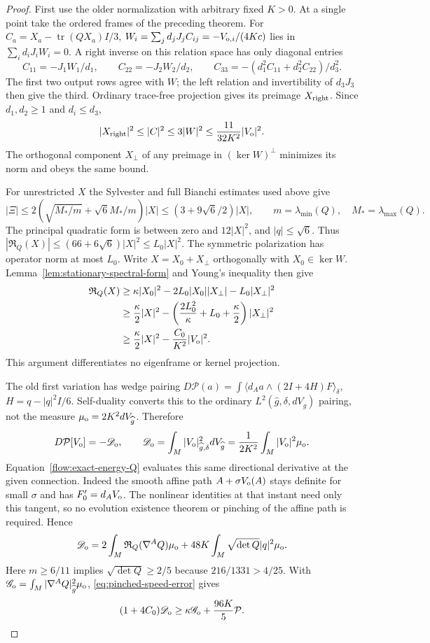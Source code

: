 \documentclass[11pt]{article}
\numberwithin{equation}{section}
\theoremstyle{definition}
\theoremstyle{remark}
\begin{document}
\begin{proof}
First use the older normalization with arbitrary fixed $K>0$.
At a single point take the ordered frames of the preceding
theorem. For $C_a=X_a-\operatorname{tr}(QX_a)I/3$,
$W_i=\sum_jd_jJ_jC_{ij}=-V_{{\rm o},i}/(4Kc)$ lies in
$\sum_i d_iJ_iW_i=0$. A right inverse on this relation space
has only diagonal entries
\[
 C_{11}=-J_1W_1/d_1,\qquad C_{22}=-J_2W_2/d_2,\qquad
 C_{33}=-(d_1^2C_{11}+d_2^2C_{22})/d_3^2.
\]
The first two output rows agree with $W$; the left relation
and invertibility of $d_3J_3$ then give the third. Ordinary
trace-free projection gives its preimage $X_{\rm right}$.
Since $d_1,d_2\ge1$ and $d_i\le d_3$,
\[
 |X_{\rm right}|^2\le|C|^2\le3|W|^2
                         \le\frac{11}{32K^2}|V_{\rm o}|^2.
\]
The orthogonal component $X_\perp$ of any preimage in
$(\ker W)^\perp$ minimizes its norm and obeys the same bound.

For unrestricted $X$ the Sylvester and full Bianchi estimates
used above give
\[
 |\Xi|\le2\left(\sqrt{M_*/m}+\sqrt6 M_*/m\right)|X|
              \le(3+9\sqrt6/2)|X|,
 \qquad m=\lambda_{\min}(Q),\quad M_*=\lambda_{\max}(Q).
\]
The principal quadratic form is between zero and $12|X|^2$,
and $|q|\le\sqrt6$. Thus
$|\mathfrak R_Q(X)|\le(66+6\sqrt6)|X|^2\le L_0|X|^2$.
The symmetric polarization has operator norm at most $L_0$.
Write $X=X_0+X_\perp$ orthogonally with $X_0\in\ker W$.
Lemma~\ref{lem:stationary-spectral-form} and Young's inequality
then give
\begin{align}
 \mathfrak R_Q(X)
 &\ge\kappa|X_0|^2-2L_0|X_0||X_\perp|-L_0|X_\perp|^2\notag\\
 &\ge\frac\kappa2|X|^2
       -\left(\frac{2L_0^2}{\kappa}+L_0+\frac\kappa2\right)|X_\perp|^2\notag\\
 &\ge\frac\kappa2|X|^2-\frac{C_0}{K^2}|V_{\rm o}|^2.
 \label{eq:pinched-speed-error}
\end{align}
This argument differentiates no eigenframe or kernel projection.

The old first variation has wedge pairing
$D\mathcal P(a)=\int\langle d_Aa\wedge(2I+4H)F\rangle_\delta$,
$H=q-|q|^2I/6$. Self-duality converts this to the ordinary
$L^2(\widehat g,\delta,dV_{\widehat g})$ pairing, not the
measure $\mu_{\rm o}=2K^2dV_{\widehat g}$. Therefore
\[
 D\mathcal P[V_{\rm o}]=-\mathscr D_{\rm o},\qquad
 \mathscr D_{\rm o}=\int_M|V_{\rm o}|_{\widehat g,\delta}^2dV_{\widehat g}
       =\frac1{2K^2}\int_M|V_{\rm o}|^2\mu_{\rm o}.
\]
Equation~\eqref{flow:exact-energy-Q} evaluates this same
directional derivative at the given connection. Indeed the
smooth affine path $A+\sigma V_{\rm o}(A)$ stays definite
for small $\sigma$ and has $F'_0=d_AV_{\rm o}$.
The nonlinear identities at that instant need only this
tangent, so no evolution existence theorem or pinching of
the affine path is required. Hence
\[
 \mathscr D_{\rm o}=2\int_M\mathfrak R_Q(\nabla^AQ)\mu_{\rm o}
                 +48K\int_M\sqrt{\det Q}|q|^2\mu_{\rm o}.
\]
Here $m\ge6/11$ implies $\sqrt{\det Q}\ge2/5$ because
$216/1331>4/25$. With
$\mathscr G_{\rm o}=\int_M|\nabla^AQ|_{\widehat g}^2\mu_{\rm o}$,
\eqref{eq:pinched-speed-error} gives
\[
 (1+4C_0)\mathscr D_{\rm o}
                  \ge\kappa\mathscr G_{\rm o}+\frac{96K}{5}\mathcal P.
\]


\end{proof}
\end{document}
